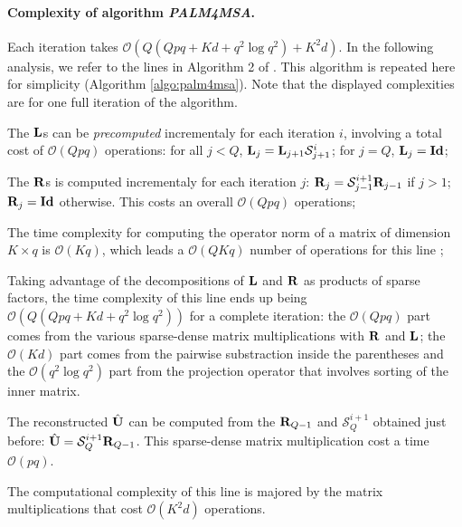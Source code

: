 \paragraph{Complexity of algorithm \textit{PALM4MSA}.}
Each iteration takes $\mathcal{O}(Q(Qpq + Kd + q^2\log q^2) + K^2d)$. In the following analysis, we refer to the lines in Algorithm 2 of \cite{magoarou2014learning}. This algorithm is repeated here for simplicity (Algorithm \ref{algo:palm4msa}). Note that the displayed complexities are for one full iteration of the algorithm.

\begin{description}[leftmargin=\parindent,labelindent=\parindent]
 
 \item [Line 3] The ${\mathbf{L}}$s can be \textit{precomputed} incrementaly for each iteration $i$, involving a total cost of $\mathcal{O}(Qpq)$ operations: for all $j < Q$, ${\mathbf{L}}_j = {\mathbf{L}}_{j+1} \mathcal{S}^i_{j+1}$; for $j = Q$, ${\mathbf{L}}_j = \textbf{Id}$;
 \item [Line 4] The ${\mathbf{R}}$s is computed incrementaly for each iteration $j$: ${\mathbf{R}}_j = \mathcal{S}^{i+1}_{j-1} {\mathbf{R}}_{j-1}$ if $j > 1$; ${\mathbf{R}}_j = \textbf{Id}$ otherwise. This costs an overall $\mathcal{O}(Qpq)$ operations;
 \item [Line 5] The time complexity for computing the operator norm of a matrix of dimension $K \times q$ is $\mathcal{O}(Kq)$, which leads a $\mathcal{O}(QKq)$ number of operations for this line ;
 \item [Line 6]  Taking advantage of the decompositions of ${\mathbf{L}}$ and ${\mathbf{R}}$ as products of sparse factors, the time complexity of this line ends up being $\mathcal{O}(Q(Qpq + Kd + q^2\log q^2))$ for a complete iteration: the $\mathcal{O}(Qpq)$ part comes from the various sparse-dense matrix multiplications with ${\mathbf{R}}$ and ${\mathbf{L}}$; the $\mathcal{O}(Kd)$ part comes from the pairwise substraction inside the parentheses and the $\mathcal{O}(q^2 \log q^2)$ part from the projection operator that involves sorting of the inner matrix.
 \item [Line 8] The reconstructed $\hat {{\mathbf{U}}}$ can be computed from the ${\mathbf{R}}_{Q-1}$ and $\mathcal{S}_Q^{i+1}$ obtained just before: $\hat {{\mathbf{U}}} = \mathcal{S}_Q^{i+1} {\mathbf{R}}_{Q-1}$. This sparse-dense matrix multiplication cost a time $\mathcal{O}(pq)$.
 \item [Line 9] The computational complexity of this line is majored by the matrix multiplications that cost $\mathcal{O}(K^2d)$ operations.
\end{description}

